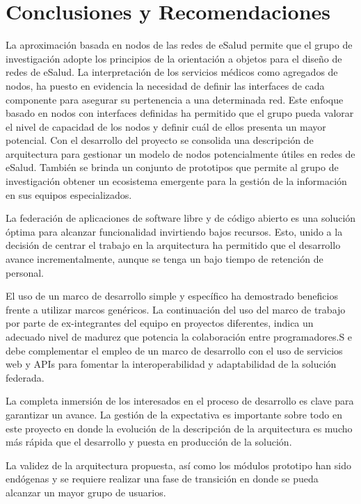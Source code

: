 \chapter{Conclusiones y Recomendaciones}

La aproximación basada en nodos de las redes de eSalud permite que el grupo de investigación adopte los principios de la orientación a objetos para el diseño de redes de eSalud. La interpretación de los servicios médicos como agregados de nodos, ha puesto en evidencia la necesidad de definir las interfaces de cada componente para asegurar su pertenencia a una determinada red. Este enfoque basado en nodos con interfaces definidas ha permitido que el grupo pueda valorar el nivel de capacidad de los nodos y definir cuál de ellos presenta un mayor potencial. 
Con el desarrollo del proyecto se consolida una descripción de arquitectura para gestionar un  modelo de nodos potencialmente útiles en redes de eSalud. También se brinda un conjunto de prototipos que permite al grupo de investigación obtener un ecosistema emergente para la gestión de la información en sus equipos especializados.

La federación de aplicaciones de software libre y de código abierto es una solución óptima para alcanzar funcionalidad invirtiendo bajos recursos. Esto, unido a la decisión de centrar el trabajo en la arquitectura ha permitido que el desarrollo avance incrementalmente, aunque se tenga un bajo tiempo de retención de personal. 

El uso de un marco de desarrollo simple y específico ha demostrado beneficios frente a utilizar marcos genéricos. La continuación del uso del marco de trabajo por parte de ex-integrantes del equipo en proyectos diferentes, indica un adecuado nivel de madurez que potencia la colaboración entre programadores.S e debe complementar el empleo de un marco de desarrollo con el uso de servicios web y APIs para fomentar la interoperabilidad y adaptabilidad de la solución federada.

La completa inmersión de los interesados en el proceso de desarrollo es clave para garantizar un avance. La gestión de la expectativa es importante sobre todo en este proyecto en donde la evolución de la descripción de la arquitectura es mucho más rápida que el desarrollo y puesta en producción de la solución.

La validez de la arquitectura propuesta, así como los módulos prototipo han sido endógenas y se requiere realizar una fase de transición en donde se pueda alcanzar un mayor grupo de usuarios.

